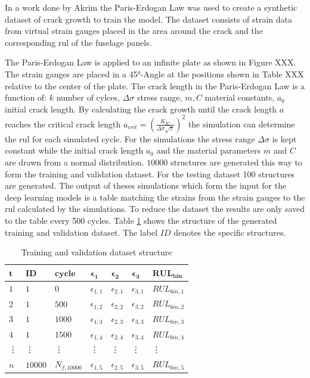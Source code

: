 \documentclass[conference]{IEEEtran}
\begin{document}
In a work done by Akrim \cite{Akrim} the Paris-Erdogan Law \cite{Paris1963} was used to create a synthetic dataset of crack growth to train the model. The dataset consists of strain data from virtual strain gauges placed in the area around the crack and the corresponding \gls{rul} of the fuselage panels.

The Paris-Erdogan Law is applied to an infinite plate as shown in Figure XXX. The strain gauges are placed in a 45°-Angle at the positions shown in Table XXX relative to the center of the plate. The crack length in the Paris-Erdogan Law is a function of: $k$ number of cylces, $\Delta \sigma$ stress range, $m, C$ material constants, $a_0$ initial crack length. By calculating the crack growth until the crack length $a$ reaches the critical crack length $a_{crit}=(\frac{K_{IC}}{\Delta \sigma \sqrt{\pi}})^2$ the simulation can determine the \gls{rul} for each simulated cycle. For the simulations the stress range $\Delta \sigma$ is kept constant while the initial crack length $a_0$ and the material parameters $m$ and $C$ are drawn from a normal distribution. $ 10000 $ structures are generated this way to form the training and validation dataset. For the testing dataset 100 structures are generated. The output of theses simulations which form the input for the deep learning models is a table matching the strains from the strain gauges to the \gls{rul} calculated by the simulations. To reduce the dataset the results are only saved to the table every 500 cycles. Table \ref{tab:sliding_window_approach} shows the structure of the generated training and validation dataset. The label $ ID $ denotes the specific structures.

\begin{table}[htp]
	\centering
	\caption{Training and validation dataset structure}
	\label{tab:sliding_window_approach}
	\begin{tabular}{lllllll}
		$ \boldsymbol{t} $ & $ \boldsymbol{ID} $ & $ \boldsymbol{cycle} $ & $ \boldsymbol{\epsilon_1} $     & $ \boldsymbol{\epsilon_2} $     & $ \boldsymbol{\epsilon_3} $     & $ \boldsymbol{RUL_{bin}} $   \\
		\hline
		$ 1 $ & $ 1 $  & $ 0 $     & $ \epsilon_{1,1} $ & $ \epsilon_{2,1} $ &  $ \epsilon_{3,1} $ &  $ RUL_{bin,1} $ \\
		$ 2 $ & $ 1 $  & $ 500 $   & $ \epsilon_{1,2} $ & $ \epsilon_{2,2} $ & $ \epsilon_{3,2} $ & $ RUL_{bin,2} $ \\
		$ 3 $ & $ 1 $  & $ 1000 $  & $ \epsilon_{1,3} $ & $ \epsilon_{2,3} $ & $ \epsilon_{3,3} $ & $ RUL_{bin,3} $ \\
		$ 4 $ & $ 1 $  & $ 1500 $  & $ \epsilon_{1,4} $ & $ \epsilon_{2,4} $ & $ \epsilon_{3,4} $ & $ RUL_{bin,4} $ \\
		\vdots & \vdots & \vdots & \vdots & \vdots &\vdots & \vdots \\
		$ n $ & $ 10000 $  & $ N_{f,10000} $  & $ \epsilon_{1,5} $ & $ \epsilon_{2,5} $ & $ \epsilon_{3,5} $ & $ RUL_{bin,5} $
	\end{tabular}
\end{table}
\end{document}
